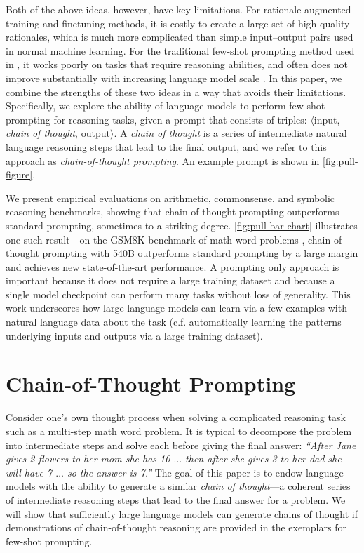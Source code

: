 Both of the above ideas, however, have key limitations. For rationale-augmented training and finetuning methods, it is costly to create a large set of high quality rationales, which is much more complicated than simple input--output pairs used in normal machine learning. 
For the traditional few-shot prompting method used in \citet{brown2020language}, it works poorly on tasks that require reasoning abilities, and often does not improve substantially with increasing language model scale \citep{rae2021scaling}. 
In this paper, we combine the strengths of these two ideas in a way that avoids their limitations. Specifically, we explore the ability of language models to perform few-shot prompting for reasoning tasks, given a prompt that consists of triples: $\langle$input, \emph{chain of thought}, output$\rangle$.
A \emph{chain of thought} is a series of intermediate natural language reasoning steps that lead to the final output, and we refer to this approach as \textit{chain-of-thought prompting}. An example prompt is shown in \cref{fig:pull-figure}. 


We present empirical evaluations on arithmetic, commonsense, and symbolic reasoning benchmarks, showing that chain-of-thought prompting outperforms standard prompting, sometimes to a striking degree.
\cref{fig:pull-bar-chart} illustrates one such result---on the GSM8K benchmark of math word problems \citep{cobbe2021training}, chain-of-thought prompting with \palm{} 540B outperforms standard prompting by a large margin and achieves new state-of-the-art performance.
A prompting only approach is important because it does not require a large training dataset and because a single model checkpoint can perform many tasks without loss of generality.
This work underscores how large language models can learn via a few examples with natural language data about the task (c.f. automatically learning the patterns underlying inputs and outputs via a large training dataset).

\section{Chain-of-Thought Prompting}
Consider one's own thought process when solving a complicated reasoning task such as a multi-step math word problem. 
It is typical to decompose the problem into intermediate steps and solve each before giving the final answer: \textit{``After Jane gives 2 flowers to her mom she has 10 $\ldots$ then after she gives 3 to her dad she will have 7 $\ldots$ so the answer is 7.''}
The goal of this paper is to endow language models with the ability to generate a similar \textit{chain of thought}---a coherent series of intermediate reasoning steps that lead to the final answer for a problem.
We will show that sufficiently large language models can generate chains of thought if demonstrations of chain-of-thought reasoning are provided in the exemplars for few-shot prompting.

